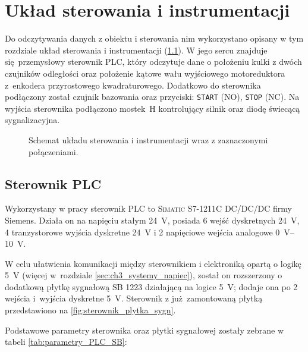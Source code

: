 \chapter{Układ sterowania i instrumentacji}
\label{cha:ch3_uklad_ster_i_instrumentacji}

Do odczytywania danych z obiektu i sterowania nim wykorzystano opisany w tym rozdziale układ sterowania i instrumentacji (\cref{fig:schemat_ukl_sterowania_instrumentacji}). W jego sercu znajduje się przemysłowy sterownik PLC, który odczytuje dane o położeniu kulki z dwóch czujników odległości oraz położenie kątowe wału wyjściowego motoreduktora z~enkodera przyrostowego kwadraturowego. Dodatkowo do sterownika podłączony został czujnik bazowania oraz przyciski: \texttt{START} (NO), \texttt{STOP} (NC). Na wyjścia sterownika podłączono mostek~H kontrolujący silnik oraz diodę świecącą sygnalizacyjna.

\begin{figure}[H]
    \centering
    
    \caption{Schemat układu sterowania i instrumentacji wraz z zaznaczonymi połączeniami.}
    \label{fig:schemat_ukl_sterowania_instrumentacji}
\end{figure}

\section{Sterownik PLC}
\label{sec:ch3_PLC}

Wykorzystany w pracy sterownik PLC to \textsc{Simatic S7-1211C DC/DC/DC} firmy Siemens. Działa on na napięciu stałym \SI{24}{V}, posiada 6 wejść dyskretnych \SI{24}{V}, 4 tranzystorowe wyjścia dyskretne \SI{24}{V} i 2 napięciowe wejścia analogowe \SIrange{0}{10}{V}.

W celu ułatwienia komunikacji między sterownikiem i elektroniką opartą o logikę \SI{5}{V} (więcej w~rozdziale \ref{sec:ch3_systemy_napiec}), został on rozszerzony o dodatkową płytkę sygnałową SB 1223 działającą na logice \SI{5}{V}; dodaje ona po 2 wejścia i~wyjścia dyskretne \SI{5}{V}. Sterownik z już zamontowaną płytką przedstawiono na \cref{fig:sterownik_plytka_sygn}.

Podstawowe parametry sterownika oraz płytki sygnałowej zostały zebrane w tabeli \ref{tab:parametry_PLC_SB}:

